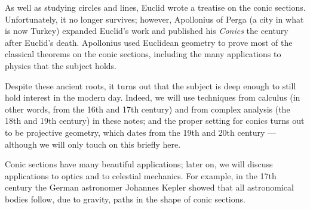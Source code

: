 \documentclass[a4paper,leqno,9pt]{article}
\theoremstyle{exercise}
\theoremstyle{plain}
\theoremstyle{definition}
\theoremstyle{remark}
\begin{document}
As well as studying circles and lines, Euclid wrote a treatise on the conic sections. Unfortunately, it no longer survives;
however, Apollonius of Perga (a city in what is now Turkey) expanded Euclid's work and published his \emph{Conics} the century
after Euclid's death. Apollonius used Euclidean geometry to prove most of the classical theorems on the conic sections, including
the many applications to physics that the subject holds.

Despite these ancient roots, it turns out that the subject is deep enough to still hold interest in the modern day. Indeed, we
will use techniques from calculus (in other words, from the 16th and 17th century) and from complex analysis (the 18th and 19th
century) in these notes; and the proper setting for conics turns out to be projective geometry, which dates from the 19th and 20th
century --- although we will only touch on this briefly here.

Conic sections have many beautiful applications; later on, we will discuss applications to optics and to celestial mechanics. For
example, in the 17th century the German astronomer Johannes Kepler showed that all astronomical bodies follow, due to gravity,
paths in the shape of conic sections.
\end{document}
